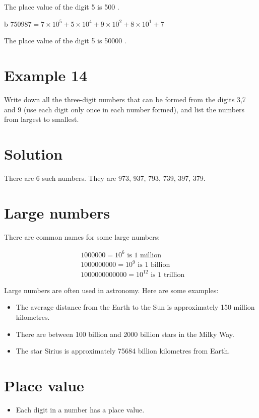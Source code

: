 \documentclass[10pt]{article}
\begin{document}
The place value of the digit 5 is 500 .

b \(750987=7 \times 10^{5}+5 \times 10^{4}+9 \times 10^{2}+8 \times 10^{1}+7\)

The place value of the digit 5 is 50000 .

\section*{Example 14}
Write down all the three-digit numbers that can be formed from the digits 3,7 and 9 (use each digit only once in each number formed), and list the numbers from largest to smallest.

\section*{Solution}
There are 6 such numbers. They are 973, 937, 793, 739, 397, 379.

\section*{Large numbers}
There are common names for some large numbers:

\[
\begin{aligned}
& 1000000=10^{6} \text { is } 1 \text { million } \\
& 1000000000=10^{9} \text { is } 1 \text { billion } \\
& 1000000000000=10^{12} \text { is } 1 \text { trillion }
\end{aligned}
\]

Large numbers are often used in astronomy. Here are some examples:

\begin{itemize}
  \item The average distance from the Earth to the Sun is approximately 150 million kilometres.
  \item There are between 100 billion and 2000 billion stars in the Milky Way.
  \item The star Sirius is approximately 75684 billion kilometres from Earth.
\end{itemize}

\section*{Place value}
\begin{itemize}
  \item Each digit in a number has a place value.
\end{itemize}
\end{document}
